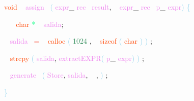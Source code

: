 \documentclass[8, usernames, dvipsnames]{beamer}
\begin{document}
\begin{frame}
\textcolor{OrangeRed}{void}
\textcolor{White}{\ }
\textcolor{Violet}{assign}\textcolor{White}{\ }
\textcolor{SkyBlue}{(}
\textcolor{Violet}{expr}\textcolor{Sepia}{\_}
\textcolor{Violet}{rec}\textcolor{White}{\ }
\textcolor{Violet}{result}\textcolor{Sepia}{,}
\textcolor{White}{\ }
\textcolor{Violet}{expr}\textcolor{Sepia}{\_}
\textcolor{Violet}{rec}\textcolor{White}{\ }
\textcolor{Violet}{p}\textcolor{Sepia}{\_}
\textcolor{Violet}{expr}\textcolor{SkyBlue}{)}
\textcolor{SkyBlue}{\{ }

 \textcolor{White}{\   }
\textcolor{White}{\   }
\textcolor{OrangeRed}{char}
\textcolor{SpringGreen}{*}
\textcolor{White}{\ }
\textcolor{Violet}{salida}\textcolor{Sepia}{;}

 \textcolor{White}{\   }
\textcolor{Violet}{salida}\textcolor{White}{\ }
\textcolor{Salmon}{=}
\textcolor{White}{\ }
\textcolor{OrangeRed}{calloc}
\textcolor{SkyBlue}{(}
\textcolor{SeaGreen}{1024}
\textcolor{Sepia}{,}
\textcolor{White}{\ }
\textcolor{OrangeRed}{sizeof}
\textcolor{SkyBlue}{(}
\textcolor{OrangeRed}{char}
\textcolor{SkyBlue}{)}
\textcolor{SkyBlue}{)}
\textcolor{Sepia}{;}

 \textcolor{White}{\   }
\textcolor{OrangeRed}{strcpy}
\textcolor{SkyBlue}{(}
\textcolor{Violet}{salida}\textcolor{Sepia}{,}
\textcolor{Violet}{extractEXPR}\textcolor{SkyBlue}{(}
\textcolor{Violet}{p}\textcolor{Sepia}{\_}
\textcolor{Violet}{expr}\textcolor{SkyBlue}{)}
\textcolor{SkyBlue}{)}
\textcolor{Sepia}{;}

 \textcolor{White}{\   }
\textcolor{Violet}{generate}\textcolor{White}{\ }
\textcolor{SkyBlue}{(}
\textcolor{Violet}{Store}\textcolor{Sepia}{,}
\textcolor{Violet}{salida}\textcolor{Sepia}{,}
\textcolor{White}{\ }
\textcolor{Sepia}{,}
\textcolor{SkyBlue}{)}
\textcolor{Sepia}{;}

 \textcolor{SkyBlue}{\} }

 
 
 
 
 \end{frame}
\end{document}
